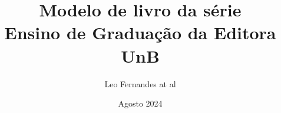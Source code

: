 \documentclass{book}
\title{Modelo de livro da série \\ Ensino de Graduação da Editora UnB}
\author{Leo Fernandes at al} %
\date{Agosto 2024}
\makeatletter
\renewcommand\mainmatter{%
  \cleardoublepage
  \@mainmattertrue
  \renewcommand{\thepage}{\arabic{page}}
}
\makeatother
\begin{document}

\makeatletter
\renewcommand{\@pnumwidth}{2.0em}
\renewcommand{\@tocrmarg}{2.7em}
\makeatother


\frontmatter



\clearpage

% 


\clearpage

% 

% 

% 


% 






\tableofcontents\thispagestyle{empty}
\cleardoublepage 


\mainmatter


\cleardoublepage

% 
% 

% 

% 


\renewcommand\appendixname{APÊNDICE}
\renewcommand\appendixpagename{APÊNDICES}
\renewcommand{\appendixtocname}{APÊNDICES}

\begin{appendices}

\cleardoublepage


\cleardoublepage



% 

% 

\end{appendices}
\end{document}
